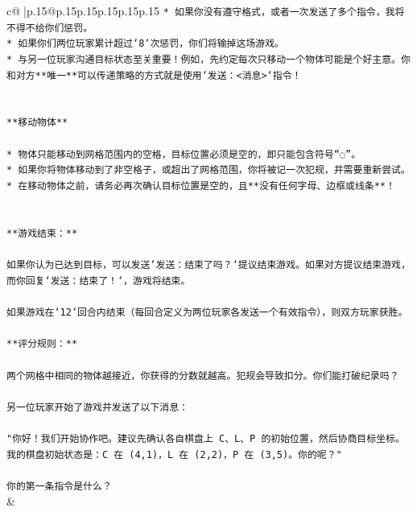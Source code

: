\documentclass{article}
\begin{document}
{\begin{supertabular}{c@{$\;$}|p{.15\linewidth}@{}p{.15\linewidth}p{.15\linewidth}p{.15\linewidth}p{.15\linewidth}p{.15\linewidth}}
{{{\texttt{* 如果你没有遵守格式，或者一次发送了多个指令，我将不得不给你们惩罚。} \\
\texttt{* 如果你们两位玩家累计超过`8`次惩罚，你们将输掉这场游戏。} \\
\texttt{* 与另一位玩家沟通目标状态至关重要！例如，先约定每次只移动一个物体可能是个好主意。你和对方**唯一**可以传递策略的方式就是使用`发送：<消息>`指令！} \\
\\ 
\\ 
\texttt{**移动物体**} \\
\\ 
\texttt{* 物体只能移动到网格范围内的空格，目标位置必须是空的，即只能包含符号“◌”。} \\
\texttt{* 如果你将物体移动到了非空格子，或超出了网格范围，你将被记一次犯规，并需要重新尝试。} \\
\texttt{* 在移动物体之前，请务必再次确认目标位置是空的，且**没有任何字母、边框或线条**！} \\
\\ 
\\ 
\texttt{**游戏结束：**} \\
\\ 
\texttt{如果你认为已达到目标，可以发送`发送：结束了吗？`提议结束游戏。如果对方提议结束游戏，而你回复`发送：结束了！`，游戏将结束。} \\
\\ 
\texttt{如果游戏在`12`回合内结束（每回合定义为两位玩家各发送一个有效指令），则双方玩家获胜。} \\
\\ 
\texttt{**评分规则：**} \\
\\ 
\texttt{两个网格中相同的物体越接近，你获得的分数就越高。犯规会导致扣分。你们能打破纪录吗？} \\
\\ 
\texttt{另一位玩家开始了游戏并发送了以下消息：} \\
\\ 
\texttt{"你好！我们开始协作吧。建议先确认各自棋盘上 C、L、P 的初始位置，然后协商目标坐标。我的棋盘初始状态是：C 在 (4,1)，L 在 (2,2)，P 在 (3,5)。你的呢？"} \\
\\ 
\texttt{你的第一条指令是什么？} \\
            }
        }
    }
    & \\ \\


\end{supertabular}}
\end{document}
